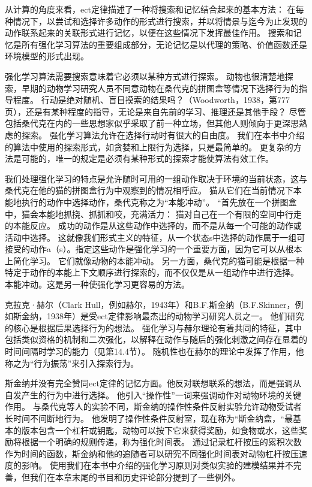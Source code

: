 {从计算的角度来看，ect定律描述了一种将搜索和记忆结合起来的基本方法：
在每种情况下，以尝试和选择许多动作的形式进行搜索，并以将情景与迄今为止发现的动作联系起来的关联形式进行记忆，以便在这些情况下发挥最佳作用。
搜索和记忆是所有强化学习算法的重要组成部分，无论记忆是以代理的策略、价值函数还是环境模型的形式出现。


强化学习算法需要搜索意味着它必须以某种方式进行探索。
动物也很清楚地探索，早期的动物学习研究人员不同意动物在桑代克的拼图盒等情况下选择行为的指导程度。
行动是绝对随机、盲目摸索的结果吗？（Woodworth，1938，第777页），还是有某种程度的指导，无论是来自先前的学习、推理还是其他手段？
尽管包括桑代克在内的一些思想家似乎采取了前一种立场，但其他人则倾向于更深思熟虑的探索。
强化学习算法允许在选择行动时有很大的自由度。
我们在本书中介绍的算法中使用的探索形式，如贪婪和上限行为选择，只是最简单的。
更复杂的方法是可能的，唯一的规定是必须有某种形式的探索才能使算法有效工作。


我们处理强化学习的特点是允许随时可用的一组动作取决于环境的当前状态，这与桑代克在他的猫的拼图盒行为中观察到的情况相呼应。
猫从它们在当前情况下本能地执行的动作中选择动作，桑代克称之为“本能冲动”。
“首先放在一个拼图盒中，猫会本能地抓挠、抓抓和咬，充满活力：
猫对自己在一个有限的空间中行走的本能反应。
成功的动作是从这些动作中选择的，而不是从每一个可能的动作或活动中选择。
这就像我们形式主义的特征，从一个状态s中选择的动作属于一组可接受的动作a（s）。指定这些动作是强化学习的一个重要方面，因为它可以从根本上简化学习。
它们就像动物的本能冲动。
另一方面，桑代克的猫可能是根据一种特定于动作的本能上下文顺序进行探索的，而不仅仅是从一组动作中进行选择。
本能冲动。这是另一种使强化学习更容易的方法。


克拉克·赫尔（Clark Hull，例如赫尔，1943年）和B.F.斯金纳（B.F.Skinner，例如斯金纳，1938年）是受ect定律影响最杰出的动物学习研究人员之一。
他们研究的核心是根据后果选择行为的想法。
强化学习与赫尔理论有着共同的特征，其中包括类似资格的机制和二次强化，以解释在动作与随后的强化刺激之间存在显着的时间间隔时学习的能力（见第14.4节）。
随机性也在赫尔的理论中发挥了作用，他称之为“行为振荡”来引入探索行为。


斯金纳并没有完全赞同ect定律的记忆方面。他反对联想联系的想法，而是强调从自发产生的行为中进行选择。
他引入“操作性”一词来强调动作对动物环境的关键作用。
与桑代克等人的实验不同，斯金纳的操作性条件反射实验允许动物受试者长时间不间断地行为。
他发明了操作性条件反射室，现在称为“斯金纳盒，“最基本的版本包含一个杠杆或钥匙，动物可以按下它来获得奖励，如食物或水，这些奖励将根据一个明确的规则传递，称为强化时间表。
通过记录杠杆按压的累积次数作为时间的函数，斯金纳和他的追随者可以研究不同强化时间表对动物杠杆按压速度的影响。
使用我们在本书中介绍的强化学习原则对类似实验的建模结果并不完善，但我们在本章末尾的书目和历史评论部分提到了一些例外。


}
